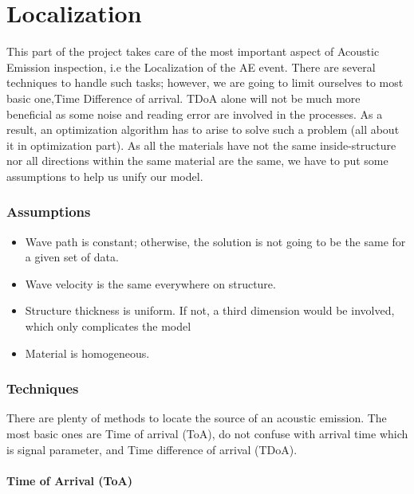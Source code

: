 
\large


\part{Localization}
This part of the project takes care of the most important aspect of
Acoustic Emission inspection, i.e the Localization of the AE event.
There are several techniques to handle such tasks; however, we are going
to limit ourselves to most basic one,Time Difference of arrival. TDoA
alone will not be much more beneficial as some noise and reading error
are involved in the processes. As a result, an optimization algorithm
has to arise to solve such a problem (all about it in optimization
part). As all the materials have not the same inside-structure nor all
directions within the same material are the same, we have to put some
assumptions to help us unify our model.


\section{Assumptions}

\begin{itemize}

\item
  Wave path is constant; otherwise, the solution is not going to be the
  same for a given set of data.
\item
  Wave velocity is the same everywhere on structure.
\item
  Structure thickness is uniform. If not, a third dimension would be
  involved, which only complicates the model
\item
  Material is homogeneous.
\end{itemize}


\section{Techniques}

There are plenty of methods to locate the source of an acoustic
emission. The most basic ones are Time of arrival (ToA), do not confuse
with arrival time which is signal parameter, and Time difference of
arrival (TDoA).


\subsection{Time of Arrival (ToA)}

